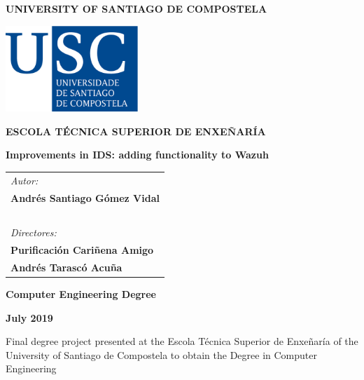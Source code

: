 \pagestyle{empty}
\begin{center}
{\bf\Large UNIVERSITY OF SANTIAGO DE COMPOSTELA}

\vspace{0.5cm}
\includegraphics[width=5cm]{figuras/logo_usc.eps}

\vspace{0.5cm}
{\bf\large ESCOLA TÉCNICA SUPERIOR DE ENXEÑARÍA}

\vspace{2cm}
{\bf\LARGE Improvements in IDS: adding functionality to Wazuh}

\end{center}

\vspace{2cm}
\hspace{4cm}\begin{tabular}{l}
{\it\Large Autor:} \\
{\bf\Large Andrés Santiago Gómez Vidal} \\
~ \\
{\it\Large Directores:} \\
{\bf\Large Purificación Cariñena Amigo} \\
{\bf\Large Andrés Tarascó Acuña} \\
\end{tabular}

\vspace{2cm}
\begin{center}
{\bf\Large Computer Engineering Degree}

\vspace{0.5cm}
{\bf\large July 2019}

\vspace{0.5cm}
Final degree project presented at the Escola Técnica Superior de Enxeñaría of the University of Santiago de Compostela to obtain the Degree in Computer Engineering
\end{center}

